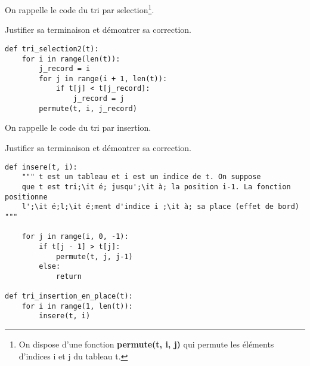 \exercice{}

On rappelle le code du tri par selection\footnote{On dispose d'une fonction {\bf permute(t, i, j)} qui permute les éléments d'indices i et j du tableau t. }.

Justifier sa terminaison et démontrer sa correction.
\begin{lstlisting}[escapeinside =;;]
def tri_selection2(t):
    for i in range(len(t)):
        j_record = i
        for j in range(i + 1, len(t)):
            if t[j] < t[j_record]:
                j_record = j
        permute(t, i, j_record)

\end{lstlisting}


\exercice

On rappelle le code du tri par insertion. 

Justifier sa terminaison et démontrer sa correction.

\begin{lstlisting}[escapeinside =;;]
def insere(t, i):
    """ t est un tableau et i est un indice de t. On suppose
    que t est tri;\it é; jusqu';\it à; la position i-1. La fonction positionne
    l';\it é;l;\it é;ment d'indice i ;\it à; sa place (effet de bord) """

    for j in range(i, 0, -1):
        if t[j - 1] > t[j]:
            permute(t, j, j-1)
        else:
            return

def tri_insertion_en_place(t):
    for i in range(1, len(t)):
        insere(t, i)

\end{lstlisting}







